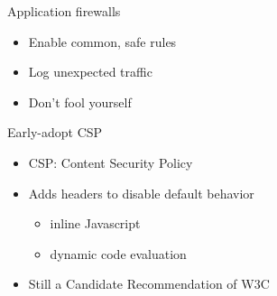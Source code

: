 \begin{frame}[plain]{Application firewalls}
 \begin{itemize}[<+-| alert@+>]
   \item Enable common, safe rules
   \item Log unexpected traffic
   \item Don't fool yourself
 \end{itemize}
\end{frame}

\begin{frame}[plain]{Early-adopt CSP}
 \begin{itemize}[<+-| alert@+>]
  \item CSP: Content Security Policy
  \item Adds headers to disable default behavior
   \begin{itemize}[<+-| alert@+>]
     \item inline Javascript
     \item dynamic code evaluation
   \end{itemize}
  \item Still a Candidate Recommendation of W3C
 \end{itemize}
\end{frame}
